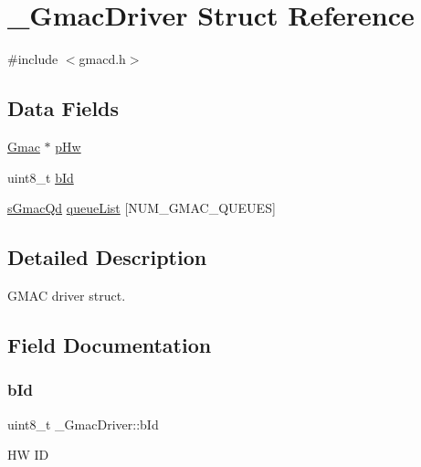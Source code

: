 \hypertarget{struct__GmacDriver}{}\section{\+\_\+\+Gmac\+Driver Struct Reference}
\label{struct__GmacDriver}


{\ttfamily \#include $<$gmacd.\+h$>$}

\subsection*{Data Fields}
\begin{DoxyCompactItemize}
\item 
\mbox{\hyperlink{structGmac}{Gmac}} $\ast$ \mbox{\hyperlink{struct__GmacDriver_ae15bd14b6b5036b4f42602ca5d1bf575}{p\+Hw}}
\item 
uint8\+\_\+t \mbox{\hyperlink{struct__GmacDriver_abf90ad9d175690aeeccd561a772736c4}{b\+Id}}
\item 
\mbox{\hyperlink{group__gmacd__types_gaf703cfd044c83739379ae7ce3b9cbac5}{s\+Gmac\+Qd}} \mbox{\hyperlink{struct__GmacDriver_a177d53cc7fff8c5372c98188ea49c164}{queue\+List}} \mbox{[}N\+U\+M\+\_\+\+G\+M\+A\+C\+\_\+\+Q\+U\+E\+U\+ES\mbox{]}
\end{DoxyCompactItemize}


\subsection{Detailed Description}
G\+M\+AC driver struct. 

\subsection{Field Documentation}
\mbox{\label{struct__GmacDriver_abf90ad9d175690aeeccd561a772736c4}} 
\subsubsection{\texorpdfstring{bId}{bId}}
{\footnotesize\ttfamily uint8\+\_\+t \+\_\+\+Gmac\+Driver\+::b\+Id}

HW ID \mbox{\label{struct__GmacDriver_ae15bd14b6b5036b4f42602ca5d1bf575}} 
